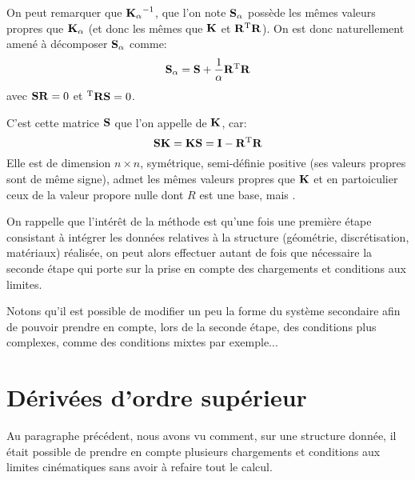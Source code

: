 \medskip
On peut remarquer que $\mathbf{K_\alpha}^{-1}$, que l'on note $\mathbf{S_\alpha}$ possède les mêmes
valeurs propres que $\mathbf{K_\alpha}$ (et donc les mêmes que $\mathbf{K}$ et $\mathbf{R}{}^\mathrm{T}\mathbf{R}$). On est donc
naturellement amené à décomposer $\mathbf{S_\alpha}$ comme:
\begin{equation} \mathbf{S_\alpha}=\mathbf{S}+\frac1\alpha \mathbf{R}{}^\mathrm{T}\mathbf{R}\end{equation}
avec $\mathbf{S}\mathbf{R}=0$ et ${}^\mathrm{T}\mathbf{R}\mathbf{S}=0$.

C'est cette matrice $\mathbf{S}$ que l'on appelle  de $\mathbf{K}$, car:
\begin{equation} \mathbf{S}\mathbf{K} = \mathbf{K}\mathbf{S} = \mathbf{I} -\mathbf{R}{}^\mathrm{T}\mathbf{R}\end{equation}
Elle est de dimension $n\times n$, symétrique, semi-définie positive (ses valeurs propres
sont de même signe), admet les mêmes valeurs propres que $\mathbf{K}$ et en partoiculier ceux
de la valeur propore nulle dont $R$ est une base, mais .

\bigskip
{}

\medskip
On rappelle que l'intérêt de la méthode est qu'une fois une première étape consistant
à intégrer les données relatives à la structure (géométrie, discrétisation, matériaux)
réalisée, on peut alors effectuer autant de fois que nécessaire la seconde étape qui porte
sur la prise en compte des chargements et conditions aux limites.

Notons qu'il est possible de modifier un peu la forme du système secondaire afin de pouvoir prendre 
en compte, lors de la seconde étape, des conditions plus complexes, comme des conditions mixtes
par exemple...










\medskip
\section{Dérivées d'ordre supérieur}\label{Sec-Deriv}

Au paragraphe précédent, nous avons vu comment, sur une structure donnée, il était
possible de prendre en compte plusieurs chargements et conditions aux limites cinématiques
sans avoir à refaire tout le calcul.

